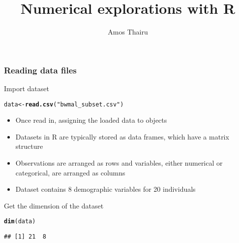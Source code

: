 \documentclass{beamer}\usepackage[]{graphicx}\usepackage[]{color}
\title{Numerical explorations with R}
\author{Amos Thairu}
\makeatletter
\newcommand{\hlstr}[1]{\textcolor[rgb]{0.192,0.494,0.8}{#1}}%
\newcommand{\hlstd}[1]{\textcolor[rgb]{0.345,0.345,0.345}{#1}}%
\newcommand{\hlkwb}[1]{\textcolor[rgb]{0.69,0.353,0.396}{#1}}%
\newcommand{\hlkwd}[1]{\textcolor[rgb]{0.737,0.353,0.396}{\textbf{#1}}}%
\newenvironment{kframe}{%
 \def\at@end@of@kframe{}%
 \ifinner\ifhmode%
  \def\at@end@of@kframe{\end{minipage}}%
  \begin{minipage}{\columnwidth}%
 \fi\fi%
 \def\FrameCommand##1{\hskip\@totalleftmargin \hskip-\fboxsep
 \colorbox{shadecolor}{##1}\hskip-\fboxsep
     \hskip-\linewidth \hskip-\@totalleftmargin \hskip\columnwidth}%
 \MakeFramed {\advance\hsize-\width
   \@totalleftmargin\z@ \linewidth\hsize
   \@setminipage}}%
 {\par\unskip\endMakeFramed%
 \at@end@of@kframe}
\newenvironment{knitrout}{}{} %
\makeatother
\begin{document}
\begin{frame}
\titlepage
\end{frame}


\begin{frame}[fragile]\frametitle{Reading data files}
Import dataset
\begin{knitrout}
\color{fgcolor}\begin{kframe}
\begin{alltt}
\hlstd{data} \hlkwb{<-} \hlkwd{read.csv}\hlstd{(}\hlstr{"bwmal_subset.csv"}\hlstd{)}
\end{alltt}
\end{kframe}
\end{knitrout}
\pause
\begin{itemize}
  \item Once read in, assigning the loaded data to objects
  \item Datasets in R are typically stored as data frames, which have a matrix structure 
  \item Observations are arranged as rows and variables, either numerical or categorical, are arranged as columns
  \item Dataset contains 8 demographic variables for 20 individuals
\end{itemize}
\pause
Get the dimension of the dataset
\begin{knitrout}
\color{fgcolor}\begin{kframe}
\begin{alltt}
\hlkwd{dim}\hlstd{(data)}
\end{alltt}
\begin{verbatim}
## [1] 21  8
\end{verbatim}
\end{kframe}
\end{knitrout}
\end{frame}
\end{document}
